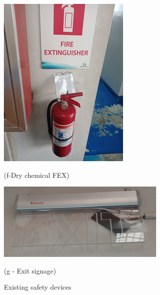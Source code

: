 \begin{figure}[!h]
\begin{minipage}[b]{0.22\linewidth}
		\includegraphics[width=\textwidth]{figures/ch04_fig_safety08}
		\caption*{(f-Dry chemical FEX)}
	\end{minipage}
	\hspace{0.03cm}
	\begin{minipage}[b]{0.5\linewidth}
		\centering
		\includegraphics[width=\textwidth]{figures/ch04_fig_safety09}
		\caption*{(g - Exit signage)}
	\end{minipage}
	\caption{Existing safety devices}
	\label{ch04_fig_safety02}
\end{figure}


